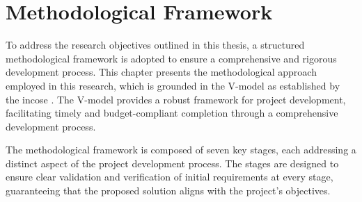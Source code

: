 \chapter{Methodological Framework}\label{ch:methodology_approach}

To address the research objectives outlined in this thesis, a structured methodological framework is adopted to ensure a comprehensive and rigorous development process. This chapter presents the methodological approach employed in this research, which is grounded in the V-model as established by the \gls{incose} \autocite{INCOSE2015}. The V-model provides a robust framework for project development, facilitating timely and budget-compliant completion through a comprehensive development process.

The methodological framework is composed of seven key stages, each addressing a distinct aspect of the project development process. The stages are designed to ensure clear validation and verification of initial requirements at every stage, guaranteeing that the proposed solution aligns with the project's objectives.

